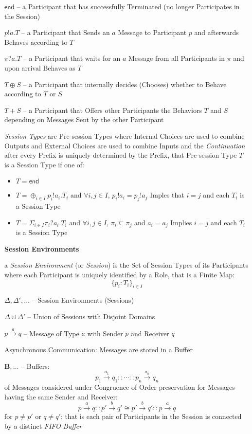 $\mathsf{end}$ -- a Participant that has successfully Terminated (no
longer Participates in the Session)

$p!a.T$ -- a Participant that Sends an $a$ Message to Participant $p$
and afterwards Behaves according to $T$

$\pi?a.T$ -- a Participant that waits for an $a$ Message from all
Participants in $\pi$ and upon arrival Behaves as $T$

$T \oplus S$ -- a Participant that internally decides (Chooses)
whether to Behave according to $T$ or $S$

$T + S$ -- a Participant that Offers other Participants the Behaviors
$T$ and $S$ depending on Messages Sent by the other Participant

\emph{Session Types} are Pre-session Types where Internal Choices are
used to combine Outputs and External Choices are used to combine
Inputs and the \emph{Continuation} after every Prefix is uniquely
determined by the Prefix, that Pre-session Type $T$ is a Session Type
if one of:
\begin{itemize}
  \item $T = \mathsf{end}$
  \item $T = \oplus_{i \in I} p_i!a_i.T_i$ and $\forall i,j \in I$,
    $p_i!a_i = p_j!a_j$ Imples that $i = j$ and each $T_i$ is a
    Session Type
  \item $T = \Sigma_{i \in I} \pi_i ? a_i.T_i$ and $\forall i, j \in
    I$, $\pi_i \subseteq \pi_j$ and $a_i = a_j$ Implies $i = j$ and
    each $T_i$ is a Session Type
\end{itemize}


\textbf{Session Environments}

a \emph{Session Environment} (or \emph{Session}) is the Set of Session
Types of its Participants where each Participant is uniquely
identified by a Role, that is a Finite Map:
\[
  \{ p_i : T_i \}_{i \in I}
\]

$\Delta, \Delta', \ldots$ -- Session Environments (Sessions)

$\Delta \uplus \Delta'$ -- Union of Sessions with Disjoint Domains

$p \xrightarrow{a} q$ -- Message of Type $a$ with Sender $p$ and
Receiver $q$

Asynchronous Communication: Messages are stored in a Buffer

$\mathbf{B}, \ldots$ -- Buffers:
\[
  p_1 \xrightarrow{a_1} q_1 :: \cdots :: p_n \xrightarrow{a_n} q_n
\]
of Messages considered under Congruence of Order preservation for
Messages having the same Sender and Receiver:
\[
  p \xrightarrow{a} q :: p' \xrightarrow{b} q' \cong
  p' \xrightarrow{b} q' :: p \xrightarrow{a} q
\]
for $p \neq p'$ or $q \neq q'$; that is each pair of Participants in
the Session is connected by a distinct \emph{FIFO Buffer}

